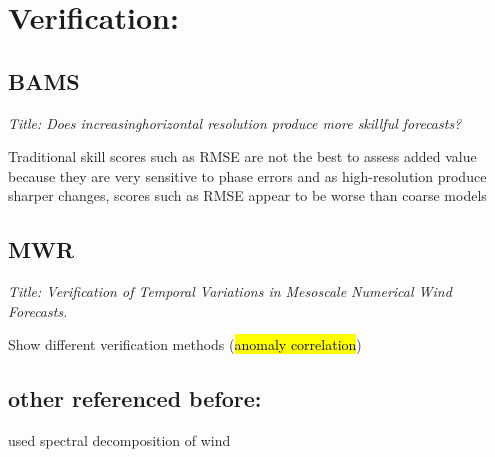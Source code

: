 \documentclass[12pt,a4paper]{article}
\begin{document}
\section{Verification:}

\subsection{\cite{Mass2002} BAMS}

\textit{Title: Does increasinghorizontal resolution produce more skillful forecasts?}

Traditional skill scores such as RMSE are not the best to assess added value because they are very sensitive to phase errors and as high-resolution produce sharper changes, scores such as RMSE appear to be worse than coarse models

\subsection{\cite{Rife2005} MWR}

\textit{Title: Verification of Temporal Variations in Mesoscale Numerical Wind Forecasts.}

Show different verification methods (\hl{anomaly correlation})

\subsection{other referenced before:}

\cite{Garcia-Diez2015} 

\cite{Winterfeldt2009}

\cite{Horvath2011} used spectral decomposition of wind


\printglossaries


\label{sec:references}
\end{document}
